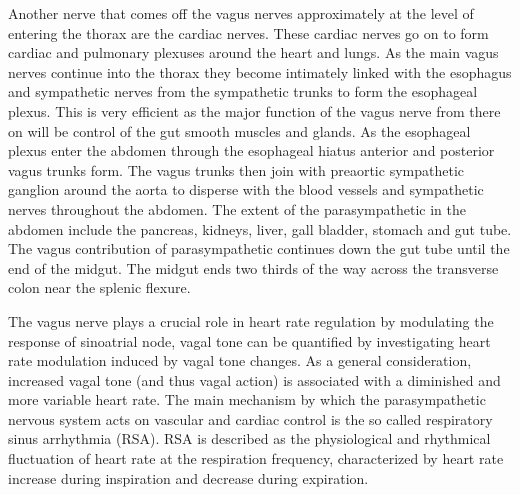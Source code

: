 Another nerve that comes off the vagus nerves approximately at the level of entering the thorax are the cardiac nerves. These cardiac nerves go on to form cardiac and pulmonary plexuses around the heart and lungs. As the main vagus nerves continue into the thorax they become intimately linked with the esophagus and sympathetic nerves from the sympathetic trunks to form the esophageal plexus. This is very efficient as the major function of the vagus nerve from there on will be control of the gut smooth muscles and glands. As the esophageal plexus enter the abdomen through the esophageal hiatus anterior and posterior vagus trunks form. The vagus trunks then join with preaortic sympathetic ganglion around the aorta to disperse with the blood vessels and sympathetic nerves throughout the abdomen. The extent of the parasympathetic in the abdomen include the pancreas, kidneys, liver, gall bladder, stomach and gut tube. The vagus contribution of parasympathetic continues down the gut tube until the end of the midgut. The midgut ends two thirds of the way across the transverse colon near the splenic flexure.

The vagus nerve plays a crucial role in heart rate regulation by modulating the response of sinoatrial node, vagal tone can be quantified by investigating heart rate modulation induced by vagal tone changes. As a general consideration, increased vagal tone (and thus vagal action) is associated with a diminished and more variable heart rate. The main mechanism by which the parasympathetic nervous system acts on vascular and cardiac control is the so called respiratory sinus arrhythmia (RSA). RSA is described as the physiological and rhythmical fluctuation of heart rate at the respiration frequency, characterized by heart rate increase during inspiration and decrease during expiration.

